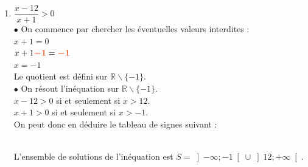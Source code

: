 \documentclass[a4paper,11pt]{article}
\begin{document}
{\begin{seanceD}{}
\begin{enumerate}
\item $\dfrac{x-12}{x+1} > 0$\\$\bullet$ On commence par chercher les éventuelles valeurs interdites :\\$x +1 = 0$ \\$x +1 {\color[HTML]{f15929}\boldsymbol{-1}} = {\color[HTML]{f15929}\boldsymbol{-1}}$\\$x = -1$\\Le quotient est défini sur $\mathbb{R} \smallsetminus \{-1\}$.\\$\bullet$ On résout l'inéquation sur $\mathbb{R} \smallsetminus \{-1\}$.\\$x -12 > 0$ si et seulement si $x > 12$.\\$x+1 > 0$ si et seulement si $x > -1$.\\On peut donc en déduire le tableau de signes suivant :\\
\\ L'ensemble de solutions de l'inéquation est $S = \left] -\infty ; -1 \right[ \cup \left] 12; +\infty \right[ $.
\end{enumerate}
\end{seanceD}
}{}
\end{document}
